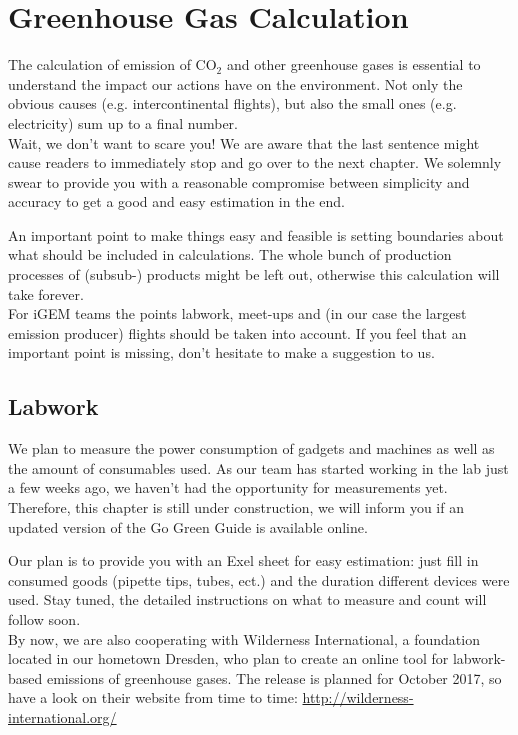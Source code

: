 
\chapter{Greenhouse Gas Calculation}\label{chap:calculation}

The calculation of emission of CO$_2$ and other greenhouse gases is essential to understand the impact our actions have on the environment. Not only the obvious causes (e.g. intercontinental flights), but also the small ones (e.g. electricity) sum up to a final number. \\
Wait, we don't want to scare you! We are aware that the last sentence might cause readers to immediately stop and go over to the next chapter.  We solemnly swear to provide you with a reasonable compromise between simplicity and accuracy to get a good and easy estimation in the end. 


An important point to make things easy and feasible is setting boundaries about what should be included in calculations. The whole bunch of production processes of (subsub-) products might be left out, otherwise this calculation will take forever. \\
For iGEM teams the points labwork, meet-ups and (in our case the largest emission producer) flights should be taken into account. If you feel that an important point is missing, don't hesitate to make a suggestion to us.

\section{Labwork}

We plan to measure the power consumption of gadgets and machines as well as the amount of consumables used. As our team has started working in the lab just a few weeks ago, we haven't had the opportunity for measurements yet. Therefore, this chapter is still under construction, we will inform you if an updated version of the Go Green Guide is available online.


Our plan is to provide you with an Exel sheet for easy estimation: just fill in consumed goods (pipette tips, tubes, ect.) and the duration different devices were used. Stay tuned, the detailed instructions on what to measure and count will follow soon.\\
By now, we are also cooperating with Wilderness International, a foundation located in our hometown Dresden, who plan to create an online tool for labwork-based emissions of greenhouse gases. The release is planned for October 2017, so  have a look on their website from time to time: 
\url{http://wilderness-international.org/} %

